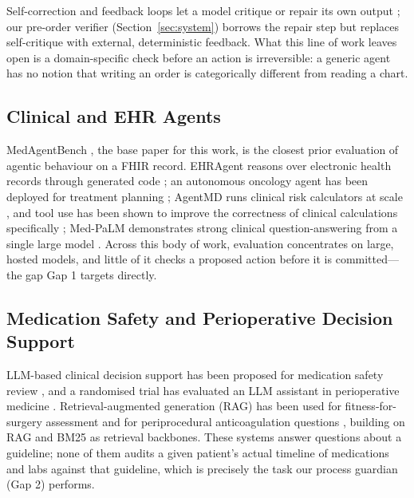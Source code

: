 \documentclass[conference]{IEEEtran}
\begin{document}
Self-correction and feedback loops let a model critique or repair its own output \cite{shinn2023reflexion,madaan2023selfrefine}; our pre-order verifier (Section~\ref{sec:system}) borrows the repair step but replaces self-critique with external, deterministic feedback. What this line of work leaves open is a domain-specific check before an action is irreversible: a generic agent has no notion that writing an order is categorically different from reading a chart.

\subsection{Clinical and EHR Agents}
MedAgentBench \cite{jiang2025medagentbench}, the base paper for this work, is the closest prior evaluation of agentic behaviour on a FHIR record. EHRAgent reasons over electronic health records through generated code \cite{shi2024ehragent}; an autonomous oncology agent has been deployed for treatment planning \cite{ferber2025oncology}; AgentMD runs clinical risk calculators at scale \cite{jin2025agentmd}, and tool use has been shown to improve the correctness of clinical calculations specifically \cite{goodell2025calculations}; Med-PaLM demonstrates strong clinical question-answering from a single large model \cite{singhal2023medpalm}. Across this body of work, evaluation concentrates on large, hosted models, and little of it checks a proposed action before it is committed---the gap Gap 1 targets directly.

\subsection{Medication Safety and Perioperative Decision Support}
LLM-based clinical decision support has been proposed for medication safety review \cite{ong2025medsafety}, and a randomised trial has evaluated an LLM assistant in perioperative medicine \cite{ke2025periop}. Retrieval-augmented generation (RAG) has been used for fitness-for-surgery assessment \cite{ke2025ragfitness} and for periprocedural anticoagulation questions \cite{zaki2026anticoag}, building on RAG \cite{lewis2020rag} and BM25 \cite{robertson2009bm25} as retrieval backbones. These systems answer questions about a guideline; none of them audits a given patient's actual timeline of medications and labs against that guideline, which is precisely the task our process guardian (Gap 2) performs.
\end{document}
